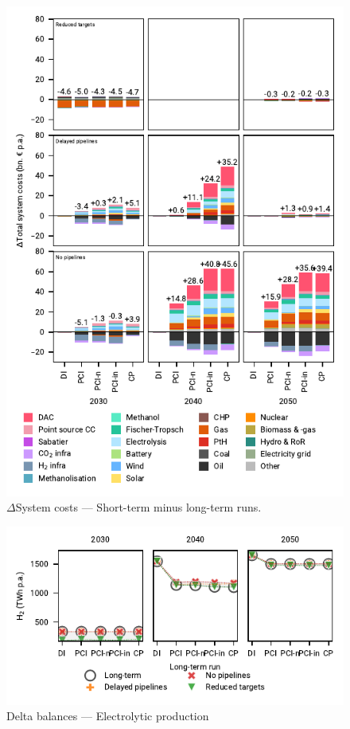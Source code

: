 \documentclass[preprint,12pt,sort&compress]{elsarticle}
\begin{document}
\begin{figure}[htbp]
  \centering
  \includegraphics{costs_overview_extended.pdf}
  \caption{$\Delta$System costs --- Short-term minus long-term runs.}
  \label{fig:costs_overview_extended}
\end{figure}
\begin{figure}[htbp]
  \centering
  \includegraphics{delta_balances_H2 Electrolysis}
  \caption{Delta balances --- Electrolytic  production}
  \label{fig:delta_balances_h2_electrolysis}
\end{figure}
\end{document}

